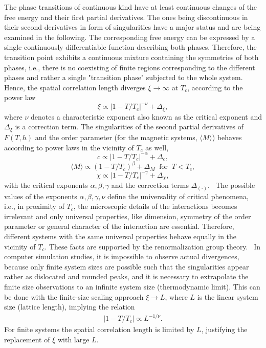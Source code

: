 The phase transitions of continuous kind have at least continuous changes of the free energy and their first partial derivatives. The ones being discontinuous
in their second derivatives in form of singularities have a major status and are being examined in the following. The corresponding free energy can be expressed 
by a single continuously differentiable function describing both phases. Therefore, the transition point exhibits a continuous mixture containing the symmetries 
of both phases, i.e., there is no coexisting of finite regions corresponding to the different phases and rather a single "transition phase" subjected to the whole 
system.~\cite{Landau1976,Schwabl2000} Hence, the spatial correlation length diverges $\xi\!\to\!\infty$ at $T_c$, according to the power law
$$ \xi \propto\left|1-T/T_c\right|^{-\nu}+\Delta_\xi, $$
where $\nu$ denotes a characteristic exponent also known as the critical exponent and $\Delta_\xi$ is a correction term. The 
singularities of the second partial derivatives of $F(T,h)$ and the order parameter (for the magnetic systems, $\langle M \rangle$) behaves according to 
power laws in the vicinity of $T_c$ as well,
$$ c \propto \left|1-T/T_c\right|^{-\alpha}+\Delta_c,$$
$$ \langle M \rangle \propto \left(1-T/T_c\right)^{\beta}+\Delta_M \  \text{ for } \  T<T_c, $$
$$ \chi \propto \left|1-T/T_c\right|^{-\gamma}+\Delta_\chi, $$
with the critical exponents $\alpha,\beta,\gamma$ and the correction terms $\Delta_{(\cdot)}$.~\cite{Janke2012} The possible values of the exponents 
$\alpha,\beta,\gamma,\nu$ define the universality of critical phenomena, i.e., in proximity of $T_c$, the microscopic details of the interactions becomes 
irrelevant and only universal properties, like dimension, symmetry of the order parameter or general character of the interaction are essential. 
Therefore, different systems with the same universal properties behave equally in the vicinity of $T_c$. These facts are supported by the renormalization
group theory.~\cite{Schwabl2000} In computer simulation studies, it is impossible to observe actual divergences, because only finite system sizes are 
possible such that the singularities appear rather as dislocated and rounded peaks, and it is necessary to extrapolate the finite size observations
to an infinite system size (thermodynamic limit). This can be done with the finite-size scaling approach $\xi\to L$, where $L$ is the linear system size 
(lattice length), implying the relation
\begin{align}
    \left|1-T/T_c\right| \propto L^{-1/\nu}.
    \label{align:FSS_power}
\end{align}
For finite systems the spatial correlation length is limited by $L$, justifying the replacement of $\xi$ with large $L$.~\cite{Janke2012} 

